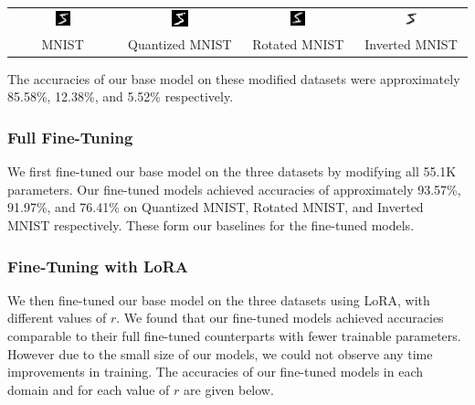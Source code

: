 \documentclass{article}
\begin{document}
\begin{center}
    \begin{tabular}{c c c c}
		\includegraphics[width=0.15\textwidth]{images/normal_5.png} & \includegraphics[width=0.15\textwidth]{images/quantized_5.png} & \includegraphics[width=0.15\textwidth]{images/rotated_5.png} & \includegraphics[width=0.15\textwidth]{images/inverted_5.png} \\
		MNIST & Quantized MNIST & Rotated MNIST & Inverted MNIST
    \end{tabular}
\end{center}

The accuracies of our base model on these modified datasets were approximately 85.58\%, 12.38\%, and 5.52\% respectively.


\subsubsection{Full Fine-Tuning}
We first fine-tuned our base model on the three datasets by modifying all 55.1K parameters. Our fine-tuned models achieved accuracies of approximately 93.57\%, 91.97\%, and 76.41\% on Quantized MNIST, Rotated MNIST, and Inverted MNIST respectively. These form our baselines for the fine-tuned models.

\subsubsection{Fine-Tuning with LoRA}
We then fine-tuned our base model on the three datasets using LoRA, with different values of $r$. We found that our fine-tuned models achieved accuracies comparable to their full fine-tuned counterparts with fewer trainable parameters. However due to the small size of our models, we could not observe any time improvements in training. The accuracies of our fine-tuned models in each domain and for each value of $r$ are given below.
\end{document}
